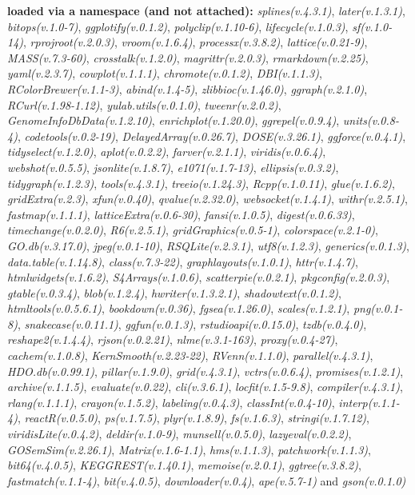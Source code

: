 \documentclass[
]{book}
\begin{document}
\textbf{loaded via a namespace (and not attached):}
\emph{splines(v.4.3.1)}, \emph{later(v.1.3.1)}, \emph{bitops(v.1.0-7)}, \emph{ggplotify(v.0.1.2)}, \emph{polyclip(v.1.10-6)}, \emph{lifecycle(v.1.0.3)}, \emph{sf(v.1.0-14)}, \emph{rprojroot(v.2.0.3)}, \emph{vroom(v.1.6.4)}, \emph{processx(v.3.8.2)}, \emph{lattice(v.0.21-9)}, \emph{MASS(v.7.3-60)}, \emph{crosstalk(v.1.2.0)}, \emph{magrittr(v.2.0.3)}, \emph{rmarkdown(v.2.25)}, \emph{yaml(v.2.3.7)}, \emph{cowplot(v.1.1.1)}, \emph{chromote(v.0.1.2)}, \emph{DBI(v.1.1.3)}, \emph{RColorBrewer(v.1.1-3)}, \emph{abind(v.1.4-5)}, \emph{zlibbioc(v.1.46.0)}, \emph{ggraph(v.2.1.0)}, \emph{RCurl(v.1.98-1.12)}, \emph{yulab.utils(v.0.1.0)}, \emph{tweenr(v.2.0.2)}, \emph{GenomeInfoDbData(v.1.2.10)}, \emph{enrichplot(v.1.20.0)}, \emph{ggrepel(v.0.9.4)}, \emph{units(v.0.8-4)}, \emph{codetools(v.0.2-19)}, \emph{DelayedArray(v.0.26.7)}, \emph{DOSE(v.3.26.1)}, \emph{ggforce(v.0.4.1)}, \emph{tidyselect(v.1.2.0)}, \emph{aplot(v.0.2.2)}, \emph{farver(v.2.1.1)}, \emph{viridis(v.0.6.4)}, \emph{webshot(v.0.5.5)}, \emph{jsonlite(v.1.8.7)}, \emph{e1071(v.1.7-13)}, \emph{ellipsis(v.0.3.2)}, \emph{tidygraph(v.1.2.3)}, \emph{tools(v.4.3.1)}, \emph{treeio(v.1.24.3)}, \emph{Rcpp(v.1.0.11)}, \emph{glue(v.1.6.2)}, \emph{gridExtra(v.2.3)}, \emph{xfun(v.0.40)}, \emph{qvalue(v.2.32.0)}, \emph{websocket(v.1.4.1)}, \emph{withr(v.2.5.1)}, \emph{fastmap(v.1.1.1)}, \emph{latticeExtra(v.0.6-30)}, \emph{fansi(v.1.0.5)}, \emph{digest(v.0.6.33)}, \emph{timechange(v.0.2.0)}, \emph{R6(v.2.5.1)}, \emph{gridGraphics(v.0.5-1)}, \emph{colorspace(v.2.1-0)}, \emph{GO.db(v.3.17.0)}, \emph{jpeg(v.0.1-10)}, \emph{RSQLite(v.2.3.1)}, \emph{utf8(v.1.2.3)}, \emph{generics(v.0.1.3)}, \emph{data.table(v.1.14.8)}, \emph{class(v.7.3-22)}, \emph{graphlayouts(v.1.0.1)}, \emph{httr(v.1.4.7)}, \emph{htmlwidgets(v.1.6.2)}, \emph{S4Arrays(v.1.0.6)}, \emph{scatterpie(v.0.2.1)}, \emph{pkgconfig(v.2.0.3)}, \emph{gtable(v.0.3.4)}, \emph{blob(v.1.2.4)}, \emph{hwriter(v.1.3.2.1)}, \emph{shadowtext(v.0.1.2)}, \emph{htmltools(v.0.5.6.1)}, \emph{bookdown(v.0.36)}, \emph{fgsea(v.1.26.0)}, \emph{scales(v.1.2.1)}, \emph{png(v.0.1-8)}, \emph{snakecase(v.0.11.1)}, \emph{ggfun(v.0.1.3)}, \emph{rstudioapi(v.0.15.0)}, \emph{tzdb(v.0.4.0)}, \emph{reshape2(v.1.4.4)}, \emph{rjson(v.0.2.21)}, \emph{nlme(v.3.1-163)}, \emph{proxy(v.0.4-27)}, \emph{cachem(v.1.0.8)}, \emph{KernSmooth(v.2.23-22)}, \emph{RVenn(v.1.1.0)}, \emph{parallel(v.4.3.1)}, \emph{HDO.db(v.0.99.1)}, \emph{pillar(v.1.9.0)}, \emph{grid(v.4.3.1)}, \emph{vctrs(v.0.6.4)}, \emph{promises(v.1.2.1)}, \emph{archive(v.1.1.5)}, \emph{evaluate(v.0.22)}, \emph{cli(v.3.6.1)}, \emph{locfit(v.1.5-9.8)}, \emph{compiler(v.4.3.1)}, \emph{rlang(v.1.1.1)}, \emph{crayon(v.1.5.2)}, \emph{labeling(v.0.4.3)}, \emph{classInt(v.0.4-10)}, \emph{interp(v.1.1-4)}, \emph{reactR(v.0.5.0)}, \emph{ps(v.1.7.5)}, \emph{plyr(v.1.8.9)}, \emph{fs(v.1.6.3)}, \emph{stringi(v.1.7.12)}, \emph{viridisLite(v.0.4.2)}, \emph{deldir(v.1.0-9)}, \emph{munsell(v.0.5.0)}, \emph{lazyeval(v.0.2.2)}, \emph{GOSemSim(v.2.26.1)}, \emph{Matrix(v.1.6-1.1)}, \emph{hms(v.1.1.3)}, \emph{patchwork(v.1.1.3)}, \emph{bit64(v.4.0.5)}, \emph{KEGGREST(v.1.40.1)}, \emph{memoise(v.2.0.1)}, \emph{ggtree(v.3.8.2)}, \emph{fastmatch(v.1.1-4)}, \emph{bit(v.4.0.5)}, \emph{downloader(v.0.4)}, \emph{ape(v.5.7-1)} and \emph{gson(v.0.1.0)}
\end{document}
